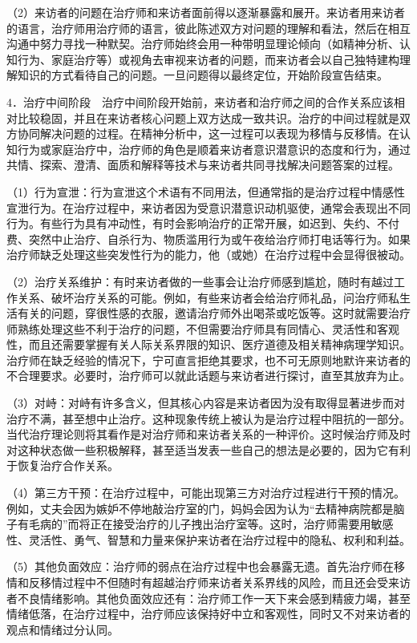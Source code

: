 （2）来访者的问题在治疗师和来访者面前得以逐渐暴露和展开。来访者用来访者的语言，治疗师用治疗师的语言，彼此陈述双方对问题的理解和看法，然后在相互沟通中努力寻找一种默契。治疗师始终会用一种带明显理论倾向（如精神分析、认知行为、家庭治疗等）或视角去审视来访者的问题，而来访者会以自己独特建构理解知识的方式看待自己的问题。一旦问题得以最终定位，开始阶段宣告结束。

4．治疗中间阶段　治疗中间阶段开始前，来访者和治疗师之间的合作关系应该相对比较稳固，并且在来访者核心问题上双方达成一致共识。治疗的中间过程就是双方协同解决问题的过程。在精神分析中，这一过程可以表现为移情与反移情。在认知行为或家庭治疗中，治疗师的角色是顺着来访者意识潜意识的态度和行为，通过共情、探索、澄清、面质和解释等技术与来访者共同寻找解决问题答案的过程。

（1）行为宣泄：行为宣泄这个术语有不同用法，但通常指的是治疗过程中情感性宣泄行为。在治疗过程中，来访者因为受意识潜意识动机驱使，通常会表现出不同行为。有些行为具有冲动性，有时会影响治疗的正常开展，如迟到、失约、不付费、突然中止治疗、自杀行为、物质滥用行为或午夜给治疗师打电话等行为。如果治疗师缺乏处理这些突发性行为的能力，他（或她）在治疗过程中会显得很被动。

（2）治疗关系维护：有时来访者做的一些事会让治疗师感到尴尬，随时有越过工作关系、破坏治疗关系的可能。例如，有些来访者会给治疗师礼品，问治疗师私生活有关的问题，穿很性感的衣服，邀请治疗师外出喝茶或吃饭等。这时就需要治疗师熟练处理这些不利于治疗的问题，不但需要治疗师具有同情心、灵活性和客观性，而且还需要掌握有关人际关系界限的知识、医疗道德及相关精神病理学知识。治疗师在缺乏经验的情况下，宁可直言拒绝其要求，也不可无原则地默许来访者的不合理要求。必要时，治疗师可以就此话题与来访者进行探讨，直至其放弃为止。

（3）对峙：对峙有许多含义，但其核心内容是来访者因为没有取得显著进步而对治疗不满，甚至想中止治疗。这种现象传统上被认为是治疗过程中阻抗的一部分。当代治疗理论则将其看作是对治疗师和来访者关系的一种评价。这时候治疗师及时对这种状态做一些积极解释，甚至适当发表一些自己的想法是必要的，因为它有利于恢复治疗合作关系。

（4）第三方干预：在治疗过程中，可能出现第三方对治疗过程进行干预的情况。例如，丈夫会因为嫉妒不停地敲治疗室的门，妈妈会因为认为“去精神病院都是脑子有毛病的”而将正在接受治疗的儿子拽出治疗室等。这时，治疗师需要用敏感性、灵活性、勇气、智慧和力量来保护来访者在治疗过程中的隐私、权利和利益。

（5）其他负面效应：治疗师的弱点在治疗过程中也会暴露无遗。首先治疗师在移情和反移情过程中不但随时有超越治疗师来访者关系界线的风险，而且还会受来访者不良情绪影响。其他负面效应还有：治疗师工作一天下来会感到精疲力竭，甚至情绪低落，在治疗过程中，治疗师应该保持好中立和客观性，同时又不对来访者的观点和情绪过分认同。

